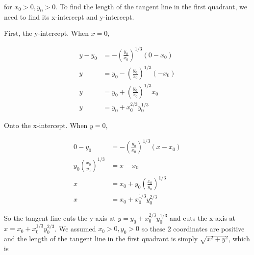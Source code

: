\documentclass[9pt]{article}
\begin{document}
for $x_0 > 0, y_0 > 0$. To find the length of the tangent line in the first quadrant, we need to find its x-intercept and y-intercept.

First, the y-intercept. When $x = 0$,

\begin{align*}
  y - y_0 &= -(\frac{y_0}{x_0})^{1/3} (0 - x_0) \\
  y &= y_0 -(\frac{y_0}{x_0})^{1/3} (- x_0) \\
  y &= y_0 + (\frac{y_0}{x_0})^{1/3} x_0 \\
  y &= y_0 + x_0^{2/3} y_0^{1/3}
\end{align*}

Onto the x-intercept. When $y = 0$,

\begin{align*}
  0 - y_0 &= -(\frac{y_0}{x_0})^{1/3}(x - x_0) \\
  y_0 (\frac{x_0}{y_0})^{1/3} &= x - x_0 \\
  x &= x_0 + y_0(\frac{x_0}{y_0})^{1/3} \\
  x &= x_0 + x_0^{1/3} y_0^{2/3}
\end{align*}

So the tangent line cuts the y-axis at $y = y_0 + x_0^{2/3} y_0^{1/3}$ and cuts the x-axis at $x = x_0 + x_0^{1/3} y_0^{2/3}$. We assumed $x_0 > 0, y_0 > 0$ so these 2 coordinates are positive and the length of the tangent line in the first quadrant is simply $\sqrt{x^2 + y^2}$, which is
\end{document}

